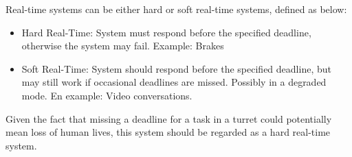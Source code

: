 Real-time systems can be either hard or soft real-time systems, defined as below:
\begin{itemize}
\item Hard Real-Time: System must respond before the specified deadline, otherwise the system may fail. Example: Brakes
\item Soft Real-Time: System should respond before the specified deadline, but may still work if occasional deadlines are missed. Possibly in a degraded mode. En example: Video conversations.
\end{itemize}\citep{realtime}

Given the fact that missing a deadline for a task in a turret could potentially mean loss of human lives, this system should be regarded as a hard real-time system.
